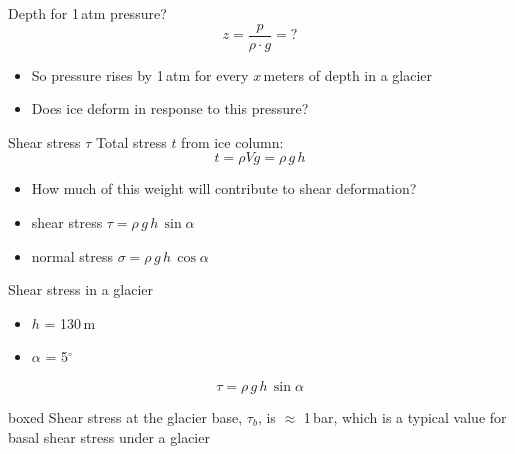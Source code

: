 \documentclass[hide notes,intlimits]{beamer}
\begin{document}
\begin{frame}{Depth for 1\,atm pressure?}
    \begin{displaymath}
       z = \frac{p}{\rho\cdot g} = ?
     \end{displaymath}
     \begin{itemize}
     \item  So pressure rises by 1\,atm for every \alert{$x$}\,meters of depth in a glacier
     \item Does ice deform in response to this pressure?
     \end{itemize}
\end{frame}


\begin{frame}{Shear stress $\tau$}
  Total stress $t$ from ice column:
    \begin{displaymath}
       t = \rho V g = \rho\,g\,h
     \end{displaymath}
     \begin{itemize}
     \item How much of this weight will contribute to shear deformation?
     \item shear stress $\tau = \rho\,g\,h\,\sin{\alpha}$
     \item normal stress $\sigma = \rho\,g\,h\,\cos{\alpha}$
    \end{itemize}
\end{frame}


\begin{frame}{Shear stress in a glacier}
  \begin{itemize}
  \item $h$ = 130\,m
  \item $\alpha$ = 5$^{\circ}$
  \end{itemize}
  \begin{displaymath}
    \tau = \rho\,g\,h\,\sin{\alpha}
  \end{displaymath}
  \begin{beamercolorbox}[rounded=true,shadow=true]{boxed}
    Shear stress at the glacier base, $\tau_{b}$, is $\approx$ 1\,bar, which is a typical value for basal shear stress under a glacier
  \end{beamercolorbox}
\end{frame}
   
\end{document}
